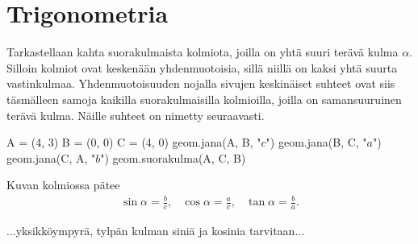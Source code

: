 
\section*{Trigonometria}

Tarkastellaan kahta suorakulmaista kolmiota, joilla on yhtä suuri terävä kulma $\alpha$.
Silloin kolmiot ovat keskenään yhdenmuotoisia, sillä niillä on kaksi yhtä suurta vastinkulmaa.
Yhdenmuotoisuuden nojalla sivujen keskinäiset suhteet ovat siis täsmälleen samoja kaikilla
suorakulmaisilla kolmioilla, joilla on samansuuruinen terävä kulma. Näille suhteet on
nimetty seuraavasti.


\begin{esimerkki}
\begin{center}
\begin{kuva}
	A = (4, 3)
	B = (0, 0)
	C = (4, 0)
	geom.jana(A, B, "$c$")
	geom.jana(B, C, "$a$")
	geom.jana(C, A, "$b$")
	geom.suorakulma(A, C, B)
\end{kuva}
\end{center}
Kuvan kolmiossa pätee
\[
\begin{array}{ccc}
\displaystyle\sin \alpha = \frac{b}{c}, &
\displaystyle\cos \alpha = \frac{a}{c}, &
\displaystyle\tan \alpha = \frac{b}{a}.
\end{array}
\]
\end{esimerkki}

...yksikköympyrä, tylpän kulman siniä ja kosinia tarvitaan...